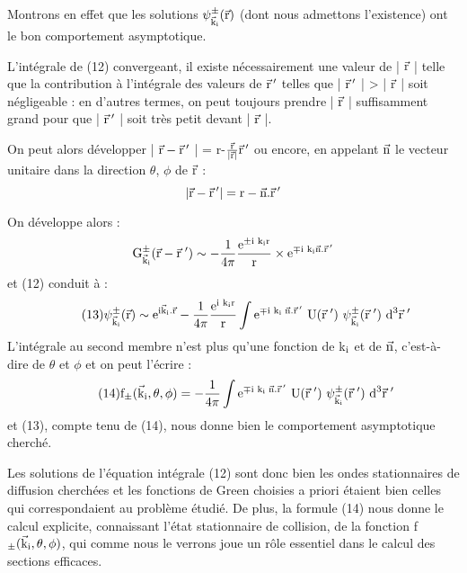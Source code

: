 

Montrons en effet que les solutions $\psi_{\vec{\text{k}}_{\text{i}}}^\pm(\vec{\text{r}})$ (dont nous
admettons l'existence) ont le bon comportement asymptotique.

L'intégrale de (12) convergeant, il existe nécessairement
une valeur de | $\vec{\text{r}}$ | telle que la contribution à l'intégrale des valeurs
de $\vec{\text{r}}\,'$ telles que | $\vec{\text{r}}\,'$ | > | $\vec{\text{r}}$ | soit négligeable : en d'autres termes,
on peut toujours prendre | $\vec{\text{r}}$ | suffisamment grand pour que | $\vec{\text{r}}\,'$ | soit
très petit devant | $\vec{\text{r}}$ |.

On peut alors développer | $\vec{\text{r}}-\vec{\text{r}}\,'$ | = r-$\frac{\vec{\text{r}}}{|\vec{\text{r}}|}\vec{\text{r}}\,'$
 ou encore,
en appelant $\vec{\text{n}}$ le vecteur unitaire dans la direction $\theta$, $\phi$ de $\vec{\text{r}}$ :
\[
|\vec{\text{r}}-\vec{\text{r}}\,'|=\text{r}-\vec{\text{n}}.\vec{\text{r}}\,'
\]

On développe alors :
\[
\text{G}_{\vec{\text{k}}_{\text{i}}}^\pm(\vec{\text{r}}-\vec{\text{r}}\;')\sim-\frac{1}{4\pi}\frac{\text{e}^{\pm\text{i k}_{\text{i}}\text{r}}}{\text{r}}\times\text{e}^{\mp\text{i k}_{\text{i}}\vec{\text{n}}.\vec{\text{r}}\,'}
\]
et (12) conduit à :
\[
\tag{13}\psi_{\vec{\text{k}}_{\text{i}}}^\pm(\vec{\text{r}})\sim
\text{e}^{\text{i}\vec{\text{k}}_{\text{i}}.\vec{\text{r}}}-
\frac{1}{4\pi}\frac{\text{e}^{\text{i k}_{\text{i}}\text{r}}}{\text{r}}
\int\text{e}^{\mp\text{i k}_{\text{i}}\;\vec{\text{n}}.\vec{\text{r}}\,'}\text{ U}(\vec{\text{r}}\;')
\ \psi_{\vec{\text{k}}_{\text{i}}}^\pm(\vec{\text{r}}\;')\text{ d}^3\vec{\text{r}}\;'
\]
L'intégrale au second membre n'est plus qu'une fonction de k$_{\text{i}}$ et de $\vec{\text{n}}$,
c'est-à-dire de $\theta$ et $\phi$ et on peut l'écrire :
\[
\tag{14}\text{f}_\pm(\vec{\text{k}}_{\text{i}},\theta, \phi)=
-\frac{1}{4\pi}
\int\text{e}^{\mp\text{i k}_{\text{i}}\;\vec{\text{n}}.\vec{\text{r}}\,'}\text{ U}(\vec{\text{r}}\;')
\ \psi_{\vec{\text{k}}_{\text{i}}}^\pm(\vec{\text{r}}\;')\text{ d}^3\vec{\text{r}}\;'
\]
et (13), compte tenu de (14), nous donne bien le comportement asymptotique
cherché.

Les solutions de l'équation intégrale (12) sont donc bien
les ondes stationnaires de diffusion cherchées et les fonctions de Green
choisies a priori étaient bien celles qui correspondaient au problème
étudié. De plus, la formule (14) nous donne le calcul explicite, connaissant
l'état stationnaire de collision, de la fonction f$_\pm(\vec{\text{k}}_{\text{i}},\theta, \phi)$, qui comme
nous le verrons joue un rôle essentiel dans le calcul des sections efficaces.

